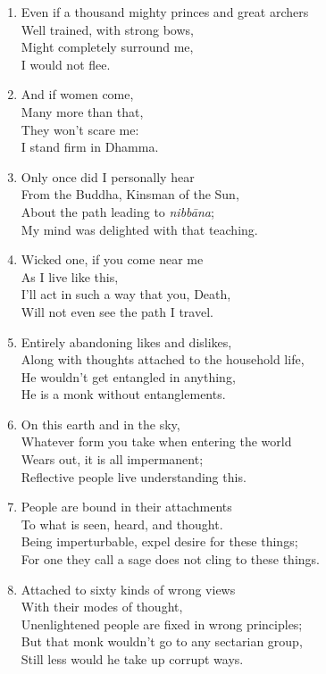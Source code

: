\documentclass[10pt, openany]{book}
\begin{document}
\begin{enumerate}
\item Even if a thousand mighty princes and great archers\\
Well trained, with strong bows,\\
Might completely surround me,\\
I would not flee.

\item And if women come,\\
Many more than that,\\
They won’t scare me:\\
I stand firm in Dhamma.

\item Only once did I personally hear\\
From the Buddha, Kinsman of the Sun,\\
About the path leading to \emph{nibbāna};\\
My mind was delighted with that teaching.

\item Wicked one, if you come near me\\
As I live like this,\\
I’ll act in such a way that you, Death,\\
Will not even see the path I travel.

\item Entirely abandoning likes and dislikes,\\
Along with thoughts attached to the household life,\\
He wouldn’t get entangled in anything,\\
He is a monk without entanglements.

\item On this earth and in the sky,\\
Whatever form you take when entering the world\\
Wears out, it is all impermanent;\\
Reflective people live understanding this.

\item People are bound in their attachments\\
To what is seen, heard, and thought.\\
Being imperturbable, expel desire for these things;\\
For one they call a sage does not cling to these things.

\item Attached to sixty kinds of wrong views \\
With their modes of thought,\\
Unenlightened people are fixed in wrong principles;\\
But that monk wouldn’t go to any sectarian group,\\
Still less would he take up corrupt ways.


\end{enumerate}
\end{document}
